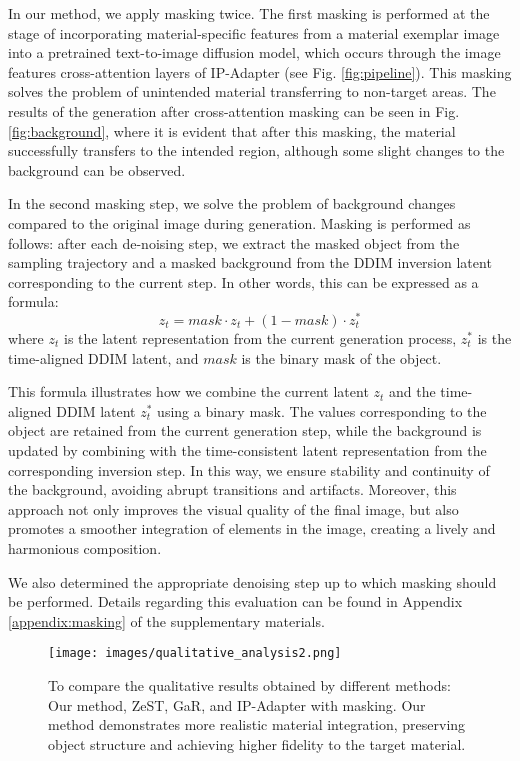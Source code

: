 In our method, we apply masking twice. The first masking is performed at the stage of incorporating material-specific features from a material exemplar image into a pretrained text-to-image diffusion model, which occurs through the image features cross-attention layers of IP-Adapter (see Fig. \ref{fig:pipeline}). This masking solves the problem of unintended material transferring to non-target areas. The results of the generation after cross-attention masking can be seen in Fig. \ref{fig:background}, where it is evident that after this masking, the material successfully transfers to the intended region, although some slight changes to the background can be observed.

In the second masking step, we solve the problem of background changes compared to the original image during generation. Masking is performed as follows: after each de-noising step, we extract the masked object from the sampling trajectory and a masked background from the DDIM inversion latent corresponding to the current step. In other words, this can be expressed as a formula:
\begin{equation}
  z_{t} = mask\cdot z_{t} + (1 - mask)\cdot z^*_{t}
  \label{eq:important}
\end{equation}
where $z_{t}$ is the latent representation from the current generation process, $z^*_{t} $ is the time-aligned DDIM latent, and $mask$ is the binary mask of the object.

This formula illustrates how we combine the current latent $z_{t}$ and the time-aligned DDIM latent $z^{*}_{t}$ using a binary mask. The values corresponding to the object are retained from the current generation step, while the background is updated by combining with the time-consistent latent representation from the corresponding inversion step. In this way, we ensure stability and continuity of the background, avoiding abrupt transitions and artifacts. Moreover, this approach not only improves the visual quality of the final image, but also promotes a smoother integration of elements in the image, creating a lively and harmonious composition. 
 
We also determined the appropriate denoising step up to which masking should be performed.
Details regarding this evaluation can be found in Appendix \ref{appendix:masking} of the supplementary materials.

\begin{figure*}[!t]
  \centering
   \vspace{-20pt}
   \texttt{[image: images/qualitative\_analysis2.png]}
   \caption{To compare the qualitative results obtained by different methods: Our method, ZeST, GaR, and IP-Adapter with masking. Our method demonstrates more realistic material integration, preserving object structure and achieving higher fidelity to the target material.}
   \label{fig:qual}

   \vspace{-5pt}
\end{figure*}


